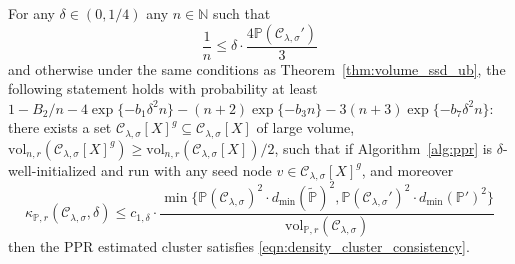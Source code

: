 \documentclass[twoside,11pt]{article}
\newcommand{\1}{\mathbf{1}}
\newcommand{\mc}[1]{\mathcal{#1}}
\newcommand{\Pbb}{\mathbb{P}}
\newcommand{\wt}[1]{\widetilde{#1}}
\newcommand{\wh}[1]{\widehat{#1}}
\newcommand{\vol}{\mathrm{vol}}
\begin{document}
\begin{theorem}
	\label{thm:density_cluster_consistent_recovery}
	For any $\delta \in (0,1/4)$ any $n \in \mathbb{N}$ such that
	\begin{equation}
	\label{eqn:density_cluster_consistent_recovery_sample_complexity}
	\frac{1}{n} \leq \delta \cdot \frac{4\Pbb(\mc{C}_{\lambda,\sigma}')}{3}
	\end{equation} 
	and otherwise under the same conditions as Theorem~\ref{thm:volume_ssd_ub}, the following statement holds with probability at least $1 - B_2/n - 4\exp\{-b_1\delta^2n\} - (n + 2)\exp\{-b_3n\} - 3(n + 3)\exp\{-b_7\delta^2n\}$: there exists a set $\mc{C}_{\lambda,\sigma}[X]^g \subseteq \mc{C}_{\lambda,\sigma}[X]$ of large volume, $\vol_{n,r}(\mc{C}_{\lambda,\sigma}[X]^g) \geq \vol_{n,r}(\mc{C}_{\lambda,\sigma}[X])/2$, such that if Algorithm~\ref{alg:ppr} is $\delta$-well-initialized and run with any seed node $v \in \mc{C}_{\lambda,\sigma}[X]^g$, and moreover
	\begin{equation}
	\label{eqn:density_cluster_consistent_recovery_condition}
	\kappa_{\Pbb,r}(\mc{C}_{\lambda,\sigma},\delta) \leq c_{1,\delta} \cdot \frac{\min\bigl\{\Pbb(\mc{C}_{\lambda,\sigma})^2 \cdot d_{\min}(\wt{\Pbb})^2, \Pbb(\mc{C}_{\lambda,\sigma}')^2 \cdot d_{\min}(\Pbb')^2\bigl\}}{\vol_{\Pbb,r}(\mc{C}_{\lambda,\sigma})}
	\end{equation}
	then the PPR estimated cluster \smash{$\wh{C}$} satisfies \eqref{eqn:density_cluster_consistency}.
\end{theorem}
\end{document}
